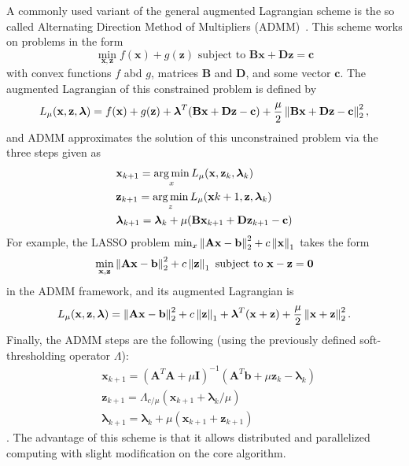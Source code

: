 A commonly used variant of the general augmented Lagrangian scheme is the so called Alternating Direction Method of Multipliers (ADMM)~\cite{gabay_dual_1976}. This scheme works on problems in the form
\[\min_{\mathbf{x},\mathbf{z}} f(\mathbf{x}) + g(\mathbf{z}) \text{ subject to } \mathbf{Bx + Dz = c}\]
with convex functions $f$ abd $g$, matrices $\mathbf{B}$ and $\mathbf{D}$, and some vector $\mathbf{c}$. The augmented Lagrangian of this constrained problem is defined by
\[L_{\mu}(\mathbf{x, z}, \boldsymbol{\lambda}) = f(\mathbf{x}) + g(\mathbf{z}) + \boldsymbol{\lambda}^T(\mathbf{Bx + Dz - c}) + \frac{\mu}{2}\left\lVert\mathbf{Bx + Dz - c}\right\rVert_2^2,\]
and ADMM approximates the solution of this unconstrained problem via the three steps given as
\begin{align*}
    & \mathbf{x}_{k+1} = \operatorname*{arg\,min}_{x} L_{\mu}(\mathbf{x}, \mathbf{z}_k, \boldsymbol{\lambda}_k)\\
    & \mathbf{z}_{k+1} = \operatorname*{arg\,min}_{z} L_{\mu}(\mathbf{x}{k+1}, \mathbf{z}, \boldsymbol{\lambda}_k)\\
    & \boldsymbol{\lambda}_{k+1} = \boldsymbol{\lambda}_k + \mu(\mathbf{Bx}_{k+1} + \mathbf{Dz}_{k+1} - \mathbf{c})
\end{align*}
For example, the LASSO problem $\min_x \left\lVert\mathbf{Ax - b}\right\rVert_2^2 + c \left\lVert\mathbf{x}\right\rVert_1$ takes the form
\[\min_{\mathbf{x,z}} \left\lVert\mathbf{Ax - b}\right\rVert_2^2 + c \left\lVert\mathbf{z}\right\rVert_1 \text{ subject to } \mathbf{x - z = 0}\]
in the ADMM framework, and its augmented Lagrangian is
\[L_{\mu}(\mathbf{x, z}, \boldsymbol{\lambda}) = \left\lVert\mathbf{Ax - b}\right\rVert_2^2 + c \left\lVert\mathbf{z}\right\rVert_1 + \boldsymbol{\lambda}^T(\mathbf{x + z}) + \frac{\mu}{2}\left\lVert\mathbf{x + z}\right\rVert_2^2.\]
Finally, the ADMM steps are the following (using the previously defined soft-thresholding operator $\Lambda$):
\begin{align*}
    & \mathbf{x}_{k+1} = (\mathbf{A}^T\mathbf{A} + \mu \mathbf{I})^{-1}(\mathbf{A}^T\mathbf{b} + \mu \mathbf{z}_k - \boldsymbol{\lambda}_k)\\
    & \mathbf{z}_{k+1} = \Lambda_{c/\mu}(\mathbf{x}_{k+1} + \boldsymbol{\lambda}_k / \mu)\\
    & \boldsymbol{\lambda}_{k+1} = \boldsymbol{\lambda}_k + \mu(\mathbf{x}_{k+1} + \mathbf{z}_{k+1})
\end{align*}.
The advantage of this scheme is that it allows distributed and parallelized computing with slight modification on the core algorithm.






